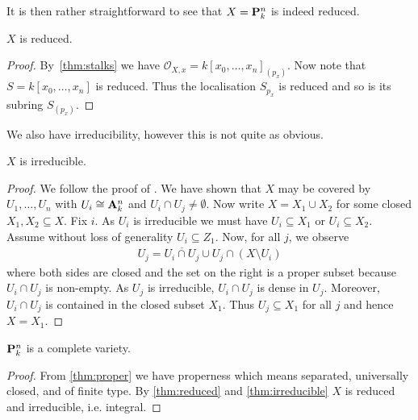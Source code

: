 \documentclass{article}
\begin{document}
It is then rather straightforward to see that $X=\mathbf{P}^{n}_{k}$
is indeed reduced.
\begin{lemma}\label{thm:reduced}
  $X$ is reduced.
  \begin{proof}
    By~\ref{thm:stalks} we have
    $\mathcal O_{X,x} = k[x_0,\ldots,x_n]_{(p_x)}$. Now note
    that $S=k[x_0,\ldots,x_n]$ is reduced. Thus the localisation
    $S_{p_x}$ is reduced and so is its subring $S_{(p_x)}$.
  \end{proof}
\end{lemma}

We also have irreducibility, however this is not quite as obvious.

\begin{theorem}\label{thm:irreducible}
  $X$ is irreducible.
  \begin{proof}
    We follow the proof of \cite[\href{https://stacks.math.columbia.edu/tag/01OL}{Tag 01OL}]{stacks-project}.
    We have shown that $X$ may be covered by $U_1,\ldots,U_n$ with
    $U_i \cong \mathbf{A}^{n}_{k}$ and $U_i\cap U_j\neq\emptyset$. Now write
    $X=X_1 \cup X_2$ for some closed $X_1,X_2\subseteq X$.
    Fix $i$. As $U_i$ is irreducible we must have
    $U_i\subseteq X_1$ or $U_i\subseteq X_2$. Assume without loss
    of generality $U_i\subseteq Z_1$. Now, for all $j$,
    we observe
    \begin{align*}
      U_j = \overline{U_i\cap U_j}\cup U_j\cap(X\setminus U_i)
    \end{align*}
    where both sides are closed and the set on the right is a proper
    subset because $U_i\cap U_j$ is non-empty. As $U_j$ is irreducible,
    $U_i\cap U_j$ is dense in $U_j$. Moreover, $U_i \cap U_j$ is
    contained in the closed subset $X_1$. Thus $U_j\subseteq X_1$
    for all $j$ and hence $X=X_1$.
  \end{proof}
\end{theorem}

\begin{corollary}
  $\mathbf{P}^{n}_{k}$ is a complete variety.
  \begin{proof}
    From \ref{thm:proper} we have properness which means separated,
    universally closed, and of finite type. By \ref{thm:reduced}
    and \ref{thm:irreducible} $X$ is reduced and irreducible, i.e.
    integral.
  \end{proof}
\end{corollary}

\printbibliography
\end{document}
